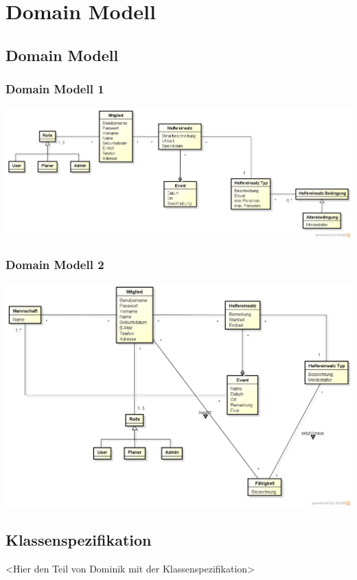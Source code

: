 \chapter{Domain Modell}
	\section{Domain Modell}
		\subsection{Domain Modell 1}
			\includegraphics[width=\textwidth]{content/domainanalyse/images/Domainmodell.png}
	
		\subsection{Domain Modell 2}
			\includegraphics[width=\textwidth]{content/domainanalyse/images/Domainmodell2.png}

	\section{Klassenspezifikation}
	<Hier den Teil von Dominik mit der Klassenspezifikation>